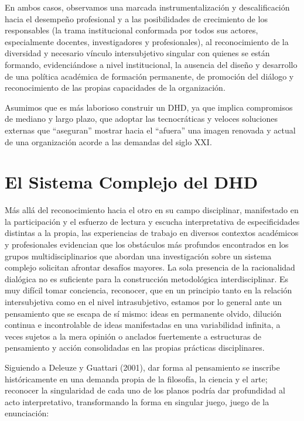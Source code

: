 En ambos casos, observamos una marcada instrumentalización y descalificación
hacia el desempeño profesional y a las posibilidades de crecimiento de los
responsables (la trama institucional conformada por todos sus actores,   
especialmente docentes, investigadores y profesionales), al reconocimiento de la
diversidad y necesario vínculo intersubjetivo singular con quienes se están
formando, evidenciándose a nivel institucional, la ausencia del diseño y
desarrollo de una política académica de formación  permanente, de
promoción del diálogo y reconocimiento de las propias capacidades de la
organización.


Asumimos que es más laborioso construir un DHD, ya que implica compromisos de
mediano y largo plazo, que adoptar las tecnocráticas y veloces soluciones
externas que “aseguran” mostrar hacia el “afuera” una imagen renovada y
actual de una organización acorde a las demandas del siglo XXI.


\section{El Sistema Complejo del DHD}

Más allá del reconocimiento hacia el otro en su campo disciplinar,
manifestado en la participación y el esfuerzo de lectura y escucha
interpretativa de especificidades distintas a la propia, las experiencias de
trabajo en diversos contextos académicos y profesionales evidencian que
los obstáculos más profundos encontrados en los grupos multidisciplinarios
que abordan una investigación sobre un sistema complejo solicitan
afrontar desafíos mayores. La sola presencia de la racionalidad dialógica no
es suficiente para la construcción metodológica interdisciplinar. Es muy
difícil tomar conciencia, reconocer, que en un principio tanto en la relación
intersubjetiva como en el nivel intrasubjetivo, estamos por lo general ante
un pensamiento que se escapa de sí mismo: ideas en permanente olvido,
dilución continua e incontrolable de ideas manifestadas en una variabilidad
infinita, a veces sujetos a la mera opinión o anclados fuertemente a
estructuras de pensamiento y acción consolidadas en las propias prácticas
disciplinares.

Siguiendo a Deleuze y Guattari (2001), dar forma al pensamiento se
inscribe históricamente en una demanda propia de la filosofía, la ciencia y
el arte; reconocer la singularidad de cada uno de los planos podría dar
profundidad al acto interpretativo, transformando la forma en singular
juego, juego de la enunciación:

